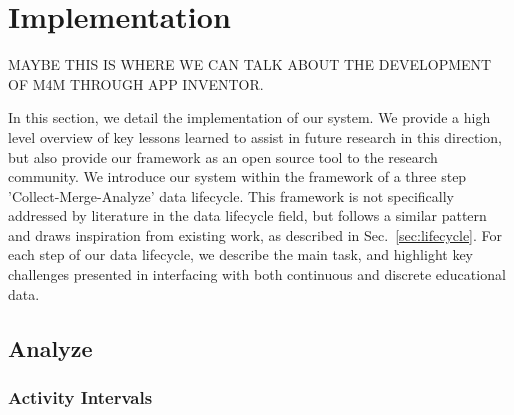 \section{Implementation}
MAYBE THIS IS WHERE WE CAN TALK ABOUT THE DEVELOPMENT OF M4M THROUGH APP INVENTOR. 


In this section, we detail the implementation of our system. We provide a high level overview of key lessons learned to assist in future research in this direction, but also provide our framework as an open source tool to the research community. We introduce our system within the framework of a three step 'Collect-Merge-Analyze' data lifecycle. This framework is not specifically addressed by literature in the data lifecycle field, but follows a similar pattern and draws inspiration from existing work, as described in Sec.~\ref{sec:lifecycle}. For each step of our data lifecycle, we describe the main task, and highlight key challenges presented in interfacing with both continuous and discrete educational data.


\subsection{Analyze}

\subsubsection{Activity Intervals}

